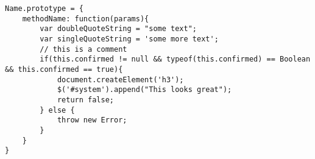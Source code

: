 \begin{lstlisting}[caption=My Javascript Example]
Name.prototype = {
	methodName: function(params){
		var doubleQuoteString = "some text";
		var singleQuoteString = 'some more text';
		// this is a comment
		if(this.confirmed != null && typeof(this.confirmed) == Boolean && this.confirmed == true){
			document.createElement('h3');
			$('#system').append("This looks great");
			return false;
		} else {
			throw new Error;
		}
	}
}
\end{lstlisting}